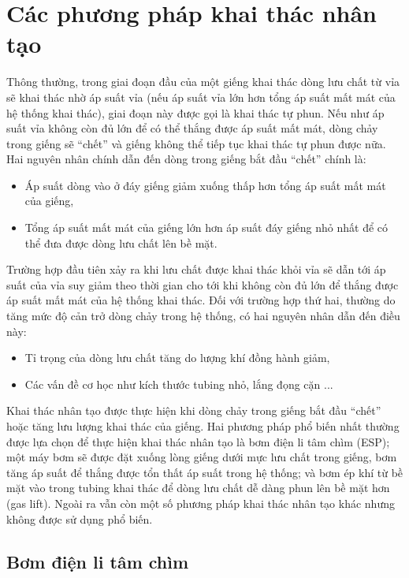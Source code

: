 \documentclass[12pt,a4paper]{report}
\begin{document}
\section{Các phương pháp khai thác nhân tạo}
Thông thường, trong giai đoạn đầu của một giếng khai thác dòng lưu chất từ vỉa sẽ khai thác nhờ áp suất vỉa (nếu áp suất vỉa lớn hơn tổng áp suất mất mát của hệ thống khai thác), giai đoạn này được gọi là khai thác tự phun. Nếu như áp suất vỉa không còn đủ lớn để có thể thắng được áp suất mất mát, dòng chảy trong giếng sẽ ``chết'' và giếng không thể tiếp tục khai thác tự phun được nữa. Hai nguyên nhân chính dẫn đến dòng trong giếng bắt đầu ``chết'' chính là:
	\begin{itemize}
		\item Áp suất dòng vào ở đáy giếng giảm xuống thấp hơn tổng áp suất mất mát của giếng,
		\item Tổng áp suất mất mát của giếng lớn hơn áp suất đáy giếng nhỏ nhất để có thể đưa được dòng lưu chất lên bề mặt.
	\end{itemize}
Trường hợp đầu tiên xảy ra khi lưu chất được khai thác khỏi vỉa sẽ dẫn tới áp suất của vỉa suy giảm theo thời gian cho tới khi không còn đủ lớn để thắng được áp suất mất mát của hệ thống khai thác. Đối với trường hợp thứ hai, thường do tăng mức độ cản trở dòng chảy trong hệ thống, có hai nguyên nhân dẫn đến điều này:
	\begin{itemize}
		\item Tỉ trọng của dòng lưu chất tăng do lượng khí đồng hành giảm,
		\item Các vấn đề cơ học như kích thước tubing nhỏ, lắng đọng cặn ...
	\end{itemize}
Khai thác nhân tạo được thực hiện khi dòng chảy trong giếng bắt đầu ``chết'' hoặc tăng lưu lượng khai thác của giếng. Hai phương pháp phổ biến nhất thường được lựa chọn để thực hiện khai thác nhân tạo là bơm điện li tâm chìm (ESP); một máy bơm sẽ được đặt xuống lòng giếng dưới mực lưu chất trong giếng, bơm tăng áp suất để thắng được tổn thất áp suất trong hệ thống; và bơm ép khí từ bề mặt vào trong tubing khai thác để dòng lưu chất dễ dàng phun lên bề mặt hơn (gas lift). Ngoài ra vẫn còn một số phương pháp khai thác nhân tạo khác nhưng không được sử dụng phổ biến.\\

\subsection{Bơm điện li tâm chìm}
\end{document}
